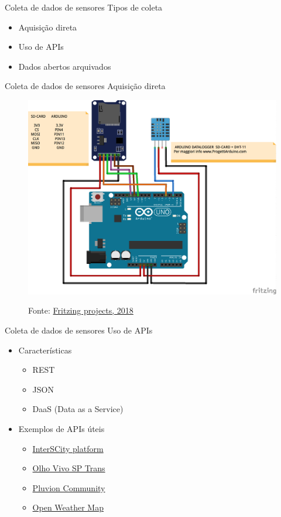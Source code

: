 \documentclass[t]{beamer}
\begin{document}
\begin{frame}{Coleta de dados de sensores}
	Tipos de coleta
	\begin{itemize}
		\item Aquisição direta
		\item Uso de APIs
		\item Dados abertos arquivados
	\end{itemize}
\end{frame}

\begin{frame}{Coleta de dados de sensores}
	Aquisição direta
	\begin{figure}
		\includegraphics[width=0.7\linewidth]{arduinodhtdatalogger}
		
		{\scriptsize Fonte: \href{http://fritzing.org/projects/75-arduino-datalogger-temperatura-e-umidita-con-dh}{Fritzing projects, 2018}}
	\end{figure}
\end{frame}


\begin{frame}{Coleta de dados de sensores}
	Uso de APIs
	\begin{itemize}
		\item Características
		\begin{itemize}
			\item REST
			\item JSON
			\item DaaS (Data as a Service)
		\end{itemize}
		\item Exemplos de APIs úteis
		\begin{itemize}
			\item \href{http://interscity.org/software/interscity-platform/}{InterSCity platform}
			\item \href{http://www.sptrans.com.br/desenvolvedores/APIOlhoVivo.aspx}{Olho Vivo SP Trans}
			\item \href{https://community.pluvion.com.br/}{Pluvion Community}
			\item \href{https://openweathermap.org/api}{Open Weather Map}
		\end{itemize}
	\end{itemize}
\end{frame}
\end{document}
